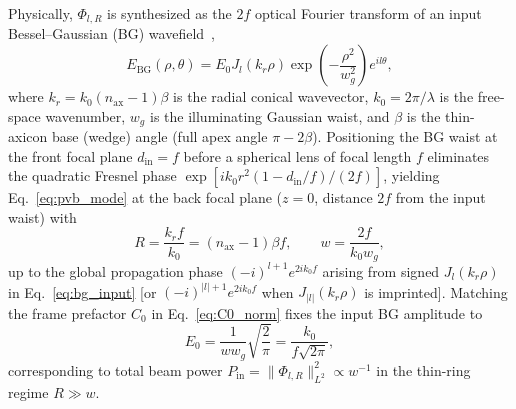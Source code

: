 \documentclass[aps,pra,reprint,nofootinbib,floatfix,longbibliography]{revtex4-2}
\theoremstyle{remark}
\newcommand{\norm}[1]{\lVert #1 \rVert}
\newcommand{\abs}[1]{\lvert #1 \rvert}
\begin{document}
Physically, $\Phi_{l,R}$ is synthesized as the $2f$ optical Fourier transform of an input Bessel--Gaussian (BG) wavefield~\cite{Vaity2015,Gori1987},
\begin{equation}
E_{\mathrm{BG}}(\rho,\theta) = E_0 J_l(k_r\rho)\exp\!\left(-\frac{\rho^2}{w_g^2}\right) e^{il\theta},
\label{eq:bg_input}
\end{equation}
where $k_r = k_0 (n_{\mathrm{ax}} - 1)\beta$ is the radial conical wavevector, $k_0 = 2\pi/\lambda$ is the free-space wavenumber, $w_g$ is the illuminating Gaussian waist, and $\beta$ is the thin-axicon base (wedge) angle (full apex angle $\pi - 2\beta$). Positioning the BG waist at the front focal plane $d_{\mathrm{in}} = f$ before a spherical lens of focal length $f$ eliminates the quadratic Fresnel phase $\exp[ik_0 r^2(1 - d_{\mathrm{in}}/f)/(2f)]$, yielding Eq.~\eqref{eq:pvb_mode} at the back focal plane ($z = 0$, distance $2f$ from the input waist) with~\cite{Vaity2015}
\begin{equation}
R = \frac{k_r f}{k_0} = (n_{\mathrm{ax}} - 1)\beta f, \qquad w = \frac{2f}{k_0 w_g},
\label{eq:R_w_2f}
\end{equation}
up to the global propagation phase $(-i)^{l+1} e^{2ik_0 f}$ arising from signed $J_l(k_r\rho)$ in Eq.~\eqref{eq:bg_input} [or $(-i)^{\abs{l}+1} e^{2ik_0 f}$ when $J_{\abs{l}}(k_r\rho)$ is imprinted]. Matching the frame prefactor $C_0$ in Eq.~\eqref{eq:C0_norm} fixes the input BG amplitude to
\begin{equation}
E_0 = \frac{1}{w w_g}\sqrt{\frac{2}{\pi}} = \frac{k_0}{f\sqrt{2\pi}},
\label{eq:E0_bridge}
\end{equation}
corresponding to total beam power $P_{\mathrm{in}} = \norm{\Phi_{l,R}}_{L^2}^2 \propto w^{-1}$ in the thin-ring regime $R \gg w$.
\end{document}

